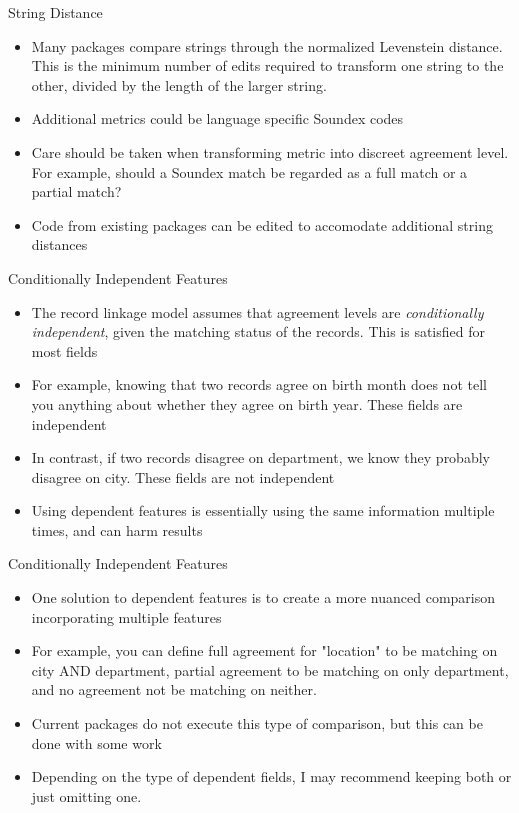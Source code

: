 \documentclass{beamer}
\begin{document}
\begin{frame}{String Distance}
	\begin{itemize}
		\item Many packages compare strings through the normalized Levenstein distance. This is the minimum number of edits required to transform one string to the other, divided by the length of the larger string.
		\item Additional metrics could be language specific Soundex codes
		\item Care should be taken when transforming metric into discreet agreement level. For example, should a Soundex match be regarded as a full match or a partial match?
		\item Code from existing packages can be edited to accomodate additional string distances
	\end{itemize}
\end{frame}

\begin{frame}{Conditionally Independent Features}
	\begin{itemize}
		\item The record linkage model assumes that agreement levels are \emph{conditionally independent}, given the matching status of the records. This is satisfied for most fields
		\item For example, knowing that two records agree on birth month does not tell you anything about whether they agree on birth year. These fields are independent
		\item In contrast, if two records disagree on department, we know they probably disagree on city. These fields are not independent
		\item Using dependent features is essentially using the same information multiple times, and can harm results
	\end{itemize}
\end{frame}

\begin{frame}{Conditionally Independent Features}
	\begin{itemize}
		\item One solution to dependent features is to create a more nuanced comparison incorporating multiple features
		\item For example, you can define full agreement for "location" to be matching on city AND department, partial agreement to be matching on only department, and no agreement not be matching on neither.
		\item Current packages do not execute this type of comparison, but this can be done with some work
		\item Depending on the type of dependent fields, I may recommend keeping both or just omitting one. 
	\end{itemize}
\end{frame}
\end{document}
